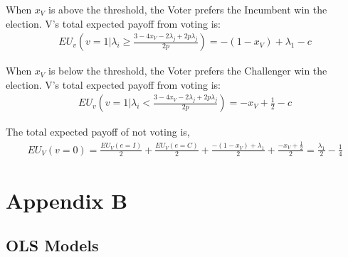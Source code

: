 \documentclass[12pt]{paper}
\begin{document}
When $x_V$ is above the threshold, the Voter prefers the Incumbent win the election. V's total expected payoff from voting is:
\begin{gather}
EU_v(v = 1 | \lambda_i \geq \frac{3 - 4x_V - 2\lambda_j + 2p\lambda_j}{2p}) = -(1 - x_V) + \lambda_1 - c
\end{gather}

When $x_V$ is below the threshold, the Voter prefers the Challenger win the election. V's total expected payoff from voting is:
\begin{gather}
EU_v(v = 1 | \lambda_i < \frac{3 - 4x_V - 2\lambda_j + 2p\lambda_j}{2p}) = -x_V + \frac{1}{2} - c
\end{gather}

The total expected payoff of not voting is,
\begin{gather}
EU_V (v=0) = \frac{EU_V (e=I)}{2} + \frac{EU_V (e=C)}{2} + \frac{- (1 - x_V ) + \lambda_1}{2} + \frac{-x_V + \frac{1}{2}}{2} = \frac{\lambda_1}{2} - \frac{1}{4}
\end{gather}


\section*{Appendix B}
\subsection{OLS Models}
\end{document}
